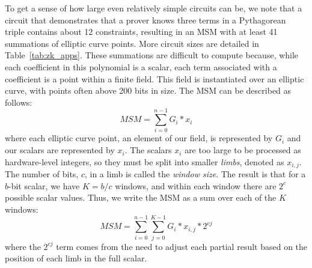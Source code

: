 \documentclass[sigconf]{acmart}
\begin{document}
To get a sense of how large even relatively simple circuits
can be, we note that a circuit that demonstrates that a prover knows three terms in a Pythagorean triple contains about 12 constraints, resulting in an MSM with at least 41 summations of elliptic curve points\cite{PlonkByHand}. More circuit sizes are detailed in Table~\ref{tab:zk_apps}. These summations are difficult to compute because, while each coefficient in this polynomial is a scalar, each term associated with a coefficient is a point within a finite field. This field is instantiated over an elliptic curve, with points often above 200 bits in size. The MSM can be described as follows:
\begin{equation}
    MSM = \sum_{i = 0}^{n-1}G_i*x_{i}
\end{equation}
where each elliptic curve point, an element of our field, is represented by $G_i$ and our scalars are represented by $x_{i}$. The scalars $x_i$ are too large to be processed as hardware-level integers, so they must be split into smaller \textit{limbs}, denoted as $x_{i,j}$.  The number of bits, $c$, in a limb is called the \textit{window size}.  The result is that for a $b$-bit scalar, we have $K=b/c$ windows, and within each window
there are $2^c$ possible scalar values. Thus, we write the MSM as a sum over 
each of the $K$ windows:
\begin{equation}
    MSM = \sum_{i = 0}^{n-1} \sum_{j = 0}^{K-1} G_i*x_{i,j}*2^{cj}
\end{equation}
where the $2^{cj}$ term comes from the need to adjust each partial result based on the position of each limb in the full scalar.
\end{document}
